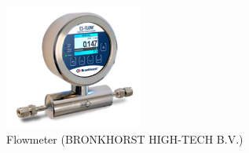 \begin{figure}[h]
    \centering
    \includegraphics[width=0.4\textwidth]{Flowmeter}
    \caption{Flowmeter (BRONKHORST HIGH-TECH B.V.)}
    \label{fig:flowmeter}
\end{figure}









